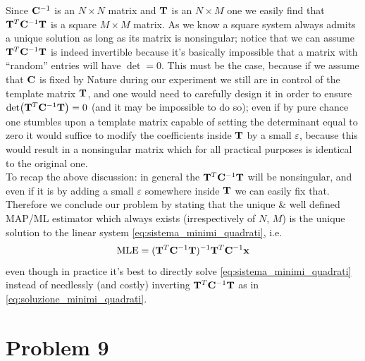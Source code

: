 \documentclass[a4paper]{article}
\newcommand{\mat}[1]{\vb{#1}}
\begin{document}
Since $\mat{C}^{-1}$ is an $N\times N$ matrix and $\mat{T}$ is an $N\times M$ one we easily find that $\mat{T}^T \mat{C}^{-1} \mat{T}$ is a square $M\times M$ matrix. As we know a square system always admits a unique solution as long as its matrix is nonsingular; notice that we can assume $\mat{T}^T \mat{C}^{-1} \mat{T}$ is indeed invertible because it's basically impossible that a matrix with ``random'' entries will have $\det = 0$. This must be the case, because if we assume that $\mat{C}$ is fixed by Nature during our experiment we still are in control of the template matrix $\mat{T}$, and one would need to carefully design it in order to ensure $\det( \mat{T}^T \mat{C}^{-1} \mat{T}) = 0$ (and it may be impossible to do so); even if by pure chance one stumbles upon a template matrix capable of setting the determinant equal to zero it would suffice to modify the coefficients inside $\mat{T}$ by a small $\varepsilon$, because this would result in a nonsingular matrix which for all practical purposes is identical to the original one.\\
To recap the above discussion: in general the $\mat{T}^T \mat{C}^{-1} \mat{T}$ will be nonsingular, and even if it is by adding a small $\varepsilon$ somewhere inside $\mat{T}$ we can easily fix that.\\
Therefore we conclude our problem by stating that the unique \& well defined MAP/ML estimator which always exists (irrespectively of $N$, $M$) is the unique solution to the linear system \eqref{eq:sistema_minimi_quadrati}, i.e.
\begin{equation}
\label{eq:soluzione_minimi_quadrati}
    \text{MLE} = (\mat{T}^T \mat{C}^{-1} \mat{T})^{-1}\mat{T}^T\mat{C}^{-1}\vb{x}
\end{equation}
even though in practice it's best to directly solve \eqref{eq:sistema_minimi_quadrati} instead of needlessly (and costly) inverting $\mat{T}^T \mat{C}^{-1} \mat{T}$ as in \eqref{eq:soluzione_minimi_quadrati}.

\section{Problem 9}
\end{document}
